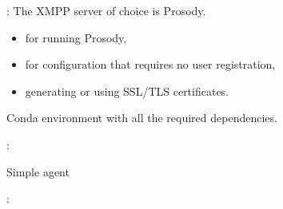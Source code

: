 \begin{frame}{\insertsection: \insertsubsection}
    \onslide<+->
    The \ac{XMPP} server of choice is Prosody.
    \hfill\href{https://prosody.im}{\faExternalLink}

    \begin{itemize}
        \item {} for running Prosody,
        \hfill\href{https://prosody.im}{\faExternalLink}

        \item {} for configuration that requires no user registration,
        \hfill\href{https://prosody.im}{\faExternalLink}

        \item generating or using SSL/TLS certificates.
        \hfill\href{https://prosody.im/doc/certificates}{\faExternalLink}
    \end{itemize}

    \bigskip
    Conda environment with all the required dependencies.
    \hfill\href{https://github.com/AILab-FOI/MAGO/blob/main/Deliverables/Phase\%201/Implementation/env.yml}{\faExternalLink}
\end{frame}

\begin{frame}[fragile]{\insertsection: \insertsubsection}
    \begin{listing}
    \caption{Simple agent}
    \end{listing}
\end{frame}




\begin{frame}{\insertsection: \insertsubsection}
\end{frame}

